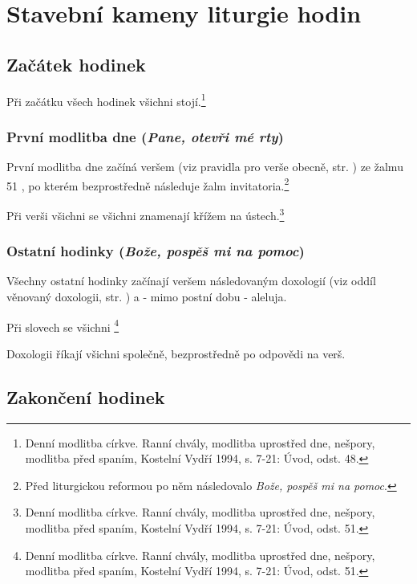 \section{Stavební kameny liturgie hodin}

\subsection{Začátek hodinek}
\label{sec:zacatek}

Při začátku všech hodinek všichni stojí.\footnote{Denní modlitba církve. Ranní chvály, modlitba uprostřed dne, nešpory, modlitba před spaním, Kostelní Vydří 1994, s. 7-21: Úvod, odst. 48.}

\subsubsection{První modlitba dne (\emph{Pane, otevři mé rty})}

První modlitba dne začíná veršem (viz pravidla pro verše obecně,
str. \pageref{sec:vers}) ze žalmu 51
, po kterém
bezprostředně následuje žalm invitatoria.\footnote{Před liturgickou
reformou po něm následovalo \emph{Bože, pospěš mi na pomoc}.}

Při verši všichni se všichni znamenají křížem na ústech.\footnote{Denní modlitba církve. Ranní chvály, modlitba uprostřed dne, nešpory, modlitba před spaním, Kostelní Vydří 1994, s. 7-21: Úvod, odst. 51.}

\subsubsection{Ostatní hodinky (\emph{Bože, pospěš mi na pomoc})}

Všechny ostatní hodinky začínají veršem 
následovaným doxologií (viz oddíl věnovaný doxologii, str. \pageref{sec:doxologie})
a - mimo postní dobu - aleluja.

Při slovech  se všichni \footnote{Denní modlitba církve. Ranní chvály, modlitba uprostřed dne, nešpory, modlitba před spaním, Kostelní Vydří 1994, s. 7-21: Úvod, odst. 51.}

Doxologii říkají všichni společně, bezprostředně po odpovědi na verš.

\subsection{Zakončení hodinek}
\label{sec:zakonceni}
